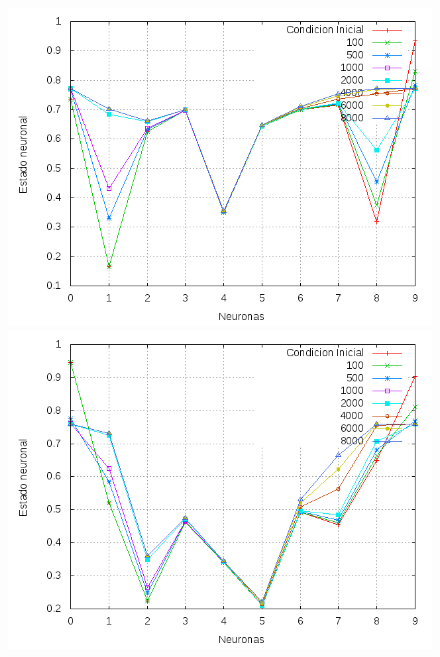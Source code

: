 \documentclass[aps,prb,onecolumn,10pt,floatfix,superscriptaddress]{article} %
\begin{document}
\begin{figure}[!htd]
\begin{minipage}[b]{0.450\linewidth}
\begin{center}
     	    \end{center}
   \end{minipage} 
	\begin{minipage}[b]{0.450\linewidth}
	   	    \begin{center}
   	    \includegraphics[scale=0.32 ]{sigma05_1.png}
     	    \end{center}
   \end{minipage}
   \begin{minipage}[b]{0.450\linewidth}
      	     \begin{center}
   	    \includegraphics[scale=0.32 ]{sigma05_2.png}
     	    \end{center}
   \end{minipage} 

\end{figure}
\end{document}
